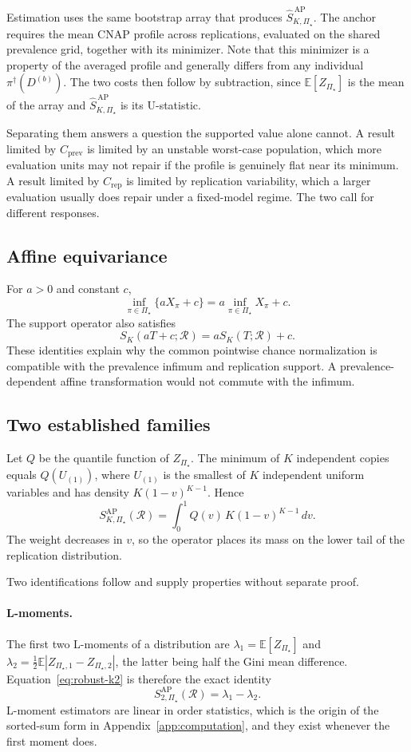 \documentclass[11pt]{article}
\newcommand{\Regime}{\mathcal{R}}
\newcommand{\PSet}{\Pi_\star}
\newcommand{\E}{\mathbb{E}}
\newcommand{\SRobHat}{\widehat S_{K,\PSet}^{\,\mathrm{AP}}}
\theoremstyle{remark}
\begin{document}
Estimation uses the same bootstrap array that produces $\SRobHat$. The anchor requires the mean CNAP profile across replications, evaluated on the shared prevalence grid, together with its minimizer. Note that this minimizer is a property of the averaged profile and generally differs from any individual $\pi^\dagger(D^{(b)})$. The two costs then follow by subtraction, since $\E[Z_{\PSet}]$ is the mean of the array and $\SRobHat$ is its U-statistic.

Separating them answers a question the supported value alone cannot. A result limited by $C_{\mathrm{prev}}$ is limited by an unstable worst-case population, which more evaluation units may not repair if the profile is genuinely flat near its minimum. A result limited by $C_{\mathrm{rep}}$ is limited by replication variability, which a larger evaluation usually does repair under a fixed-model regime. The two call for different responses.

\subsection{Affine equivariance}

For $a>0$ and constant $c$,
\[
\inf_{\pi\in\PSet}\{aX_\pi+c\}
=
a\inf_{\pi\in\PSet}X_\pi+c.
\]
The support operator also satisfies
\[
S_K(aT+c;\Regime)
=
aS_K(T;\Regime)+c.
\]
These identities explain why the common pointwise chance normalization is compatible with the prevalence infimum and replication support. A prevalence-dependent affine transformation would not commute with the infimum.

\subsection{Two established families}
\label{app:families}

Let $Q$ be the quantile function of $Z_{\PSet}$. The minimum of $K$ independent copies equals $Q(U_{(1)})$, where $U_{(1)}$ is the smallest of $K$ independent uniform variables and has density $K(1-v)^{K-1}$. Hence
\begin{equation}
S_{K,\PSet}^{\mathrm{AP}}(\Regime)
=
\int_0^1
Q(v)\,K(1-v)^{K-1}\,dv.
\label{eq:quantile-weight}
\end{equation}
The weight decreases in $v$, so the operator places its mass on the lower tail of the replication distribution.

Two identifications follow and supply properties without separate proof.

\paragraph{L-moments.}
The first two L-moments of a distribution \cite{hosking1990lmoments} are $\lambda_1=\E[Z_{\PSet}]$ and $\lambda_2=\tfrac12\E|Z_{\PSet,1}-Z_{\PSet,2}|$, the latter being half the Gini mean difference. Equation~\eqref{eq:robust-k2} is therefore the exact identity
\[
S_{2,\PSet}^{\mathrm{AP}}(\Regime)
=
\lambda_1-\lambda_2 .
\]
L-moment estimators are linear in order statistics, which is the origin of the sorted-sum form in Appendix~\ref{app:computation}, and they exist whenever the first moment does.
\end{document}
